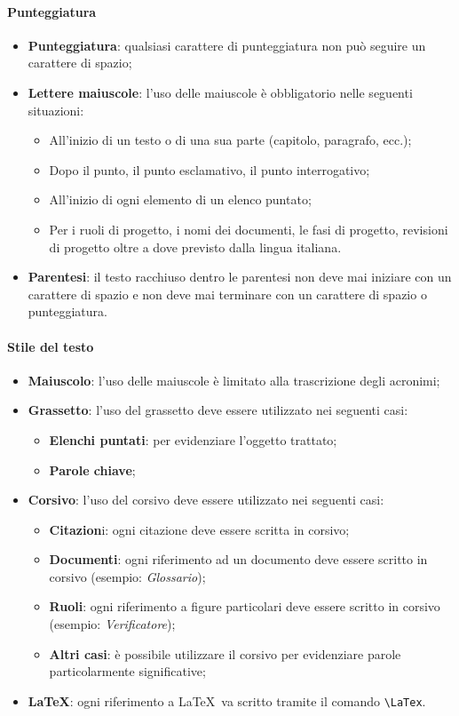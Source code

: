 \paragraph{Punteggiatura}
\begin{itemize}
	\item \textbf{Punteggiatura}: qualsiasi carattere di punteggiatura non può seguire un carattere di spazio;
	\item \textbf{Lettere maiuscole}: l'uso delle maiuscole è obbligatorio nelle seguenti situazioni:
	\begin{itemize}
		\item All'inizio di un  testo o di una sua parte (capitolo, paragrafo, ecc.);
		\item Dopo il punto, il punto esclamativo, il punto interrogativo;
		\item All'inizio di ogni elemento di un elenco puntato;
		\item Per i ruoli di progetto, i nomi dei documenti, le fasi di progetto, revisioni di progetto oltre a dove previsto dalla lingua italiana.
	\end{itemize}
	\item \textbf{Parentesi}: il testo racchiuso dentro le parentesi non deve mai iniziare con un carattere di spazio e non deve mai terminare con un carattere di spazio o punteggiatura.
\end{itemize}	

\newpage
\paragraph{Stile del testo}
\begin{itemize}
	\item \textbf{Maiuscolo}: l'uso delle maiuscole è limitato alla trascrizione degli acronimi;
	\item \textbf{Grassetto}: l'uso del grassetto deve essere utilizzato nei seguenti casi: 
	\begin{itemize}
		\item \textbf{Elenchi puntati}: per evidenziare l'oggetto trattato;
		\item \textbf{Parole chiave};
	\end{itemize}
	\item \textbf{Corsivo}: l'uso del corsivo deve essere utilizzato nei seguenti casi:
	\begin{itemize}
		\item \textbf{Citazion}i: ogni citazione deve essere scritta in corsivo; 
		\item \textbf{Documenti}: ogni riferimento ad un documento deve essere scritto in corsivo (esempio: \textit{Glossario});
		\item \textbf{Ruoli}: ogni riferimento a figure particolari deve essere scritto in corsivo (esempio: \textit{Verificatore});
		\item \textbf{Altri casi}: è possibile utilizzare il corsivo per evidenziare parole particolarmente significative;
	\end{itemize}
	\item \textbf{\LaTeX}: ogni riferimento a \LaTeX\ va scritto tramite il comando \verb|\LaTex|.
\end{itemize}

